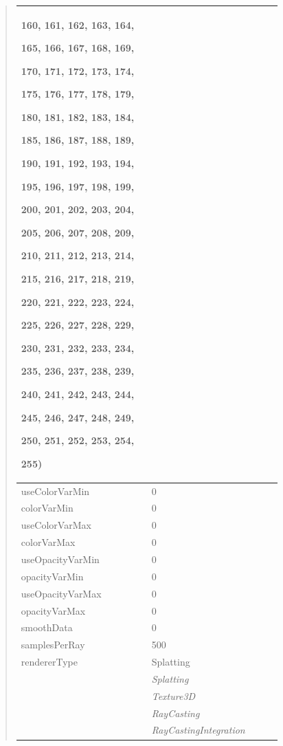 \documentclass[letterpaper,10pt,english]{sphinxmanual}
\begin{document}
\begin{quote}
\begin{longtable}{|p{0.475\linewidth}|p{0.475\linewidth}|}
\begin{DUlineblock}{0em}
\item[] 160, 161, 162, 163, 164,
\item[] 165, 166, 167, 168, 169,
\item[] 170, 171, 172, 173, 174,
\item[] 175, 176, 177, 178, 179,
\item[] 180, 181, 182, 183, 184,
\item[] 185, 186, 187, 188, 189,
\item[] 190, 191, 192, 193, 194,
\item[] 195, 196, 197, 198, 199,
\item[] 200, 201, 202, 203, 204,
\item[] 205, 206, 207, 208, 209,
\item[] 210, 211, 212, 213, 214,
\item[] 215, 216, 217, 218, 219,
\item[] 220, 221, 222, 223, 224,
\item[] 225, 226, 227, 228, 229,
\item[] 230, 231, 232, 233, 234,
\item[] 235, 236, 237, 238, 239,
\item[] 240, 241, 242, 243, 244,
\item[] 245, 246, 247, 248, 249,
\item[] 250, 251, 252, 253, 254,
\item[] 255)
\end{DUlineblock}
\\
\hline
useColorVarMin
 & 
0
\\
\hline
colorVarMin
 & 
0
\\
\hline
useColorVarMax
 & 
0
\\
\hline
colorVarMax
 & 
0
\\
\hline
useOpacityVarMin
 & 
0
\\
\hline
opacityVarMin
 & 
0
\\
\hline
useOpacityVarMax
 & 
0
\\
\hline
opacityVarMax
 & 
0
\\
\hline
smoothData
 & 
0
\\
\hline
samplesPerRay
 & 
500
\\
\hline
rendererType
 & 
Splatting
\\
\hline & 
\emph{Splatting}
\\
\hline & 
\emph{Texture3D}
\\
\hline & 
\emph{RayCasting}
\\
\hline & 
\emph{RayCastingIntegration}
\\

\end{longtable}
\end{quote}
\end{document}
